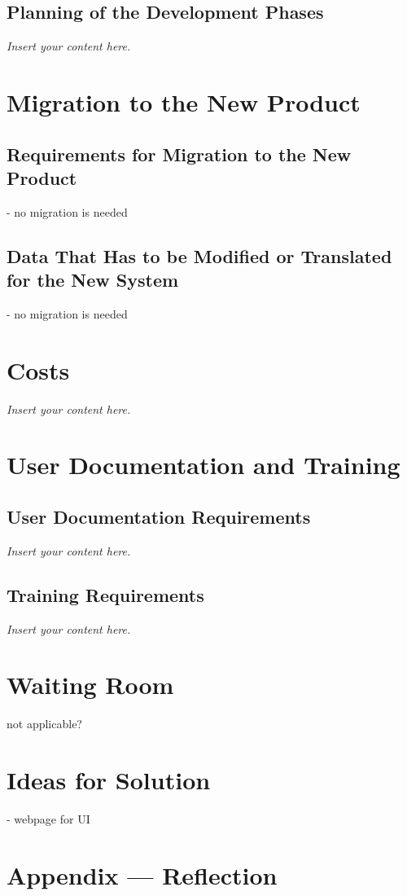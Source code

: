 \documentclass[12pt]{article}
\newcommand{\lips}{\textit{Insert your content here.}}
\begin{document}
\subsection{Planning of the Development Phases}
\lips

\section{Migration to the New Product}
\subsection{Requirements for Migration to the New Product}

- no migration is needed

\subsection{Data That Has to be Modified or Translated for the New System}

- no migration is needed

\section{Costs}
\lips
\section{User Documentation and Training}
\subsection{User Documentation Requirements}
\lips
\subsection{Training Requirements}
\lips

\section{Waiting Room}

not applicable?

\section{Ideas for Solution}

- webpage for UI

\newpage{}
\section*{Appendix --- Reflection}




\end{document}
